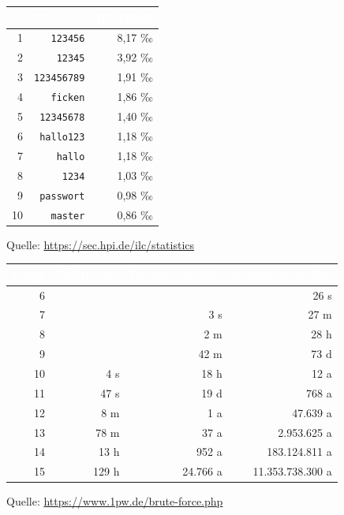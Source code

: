 \begin{frame}
\begin{longtable}{|r|r|r|}
\hline
\rowcolor{ffLightRed} & \textcolor{white}{Passwort} & \textcolor{white}{Häufigkeit} \\
\hline
 1 & \texttt{123456}    & 8,17 ‰ \\\hline
 2 & \texttt{12345}     & 3,92 ‰ \\\hline
 3 & \texttt{123456789} & 1,91 ‰ \\\hline
 4 & \texttt{ficken}    & 1,86 ‰ \\\hline
 5 & \texttt{12345678}  & 1,40 ‰ \\\hline
 6 & \texttt{hallo123}  & 1,18 ‰ \\\hline
 7 & \texttt{hallo}     & 1,18 ‰ \\\hline
 8 & \texttt{1234}      & 1,03 ‰ \\\hline
 9 & \texttt{passwort}  & 0,98 ‰ \\\hline
10 & \texttt{master}    & 0,86 ‰ \\\hline
\end{longtable}
\scriptsize Quelle: \href{https://sec.hpi.de/ilc/statistics}{https://sec.hpi.de/ilc/statistics}
\end{frame}

\begin{frame}
\begin{longtable}{|r|r|r|r|}
\hline
\rowcolor{ffLightRed} 
\textcolor{white}{Länge} & \textcolor{white}{Ziffern (10)} & \textcolor{white}{Buchstaben (26)} & \textcolor{white}{Kombination (62)}\\
\hline
 6 &       &          &             26 s \\\hline
 7 &       &      3 s &             27 m \\\hline
 8 &       &      2 m &             28 h \\\hline
 9 &       &     42 m &             73 d \\\hline
10 &   4 s &     18 h &             12 a \\\hline
11 &  47 s &     19 d &            768 a \\\hline
12 &   8 m &      1 a &         47.639 a \\\hline
13 &  78 m &     37 a &      2.953.625 a \\\hline
14 &  13 h &    952 a &    183.124.811 a \\\hline
15 & 129 h & 24.766 a & 11.353.738.300 a \\\hline
\end{longtable}
\scriptsize Quelle: \href{https://www.1pw.de/brute-force.php}{https://www.1pw.de/brute-force.php}
\end{frame}

